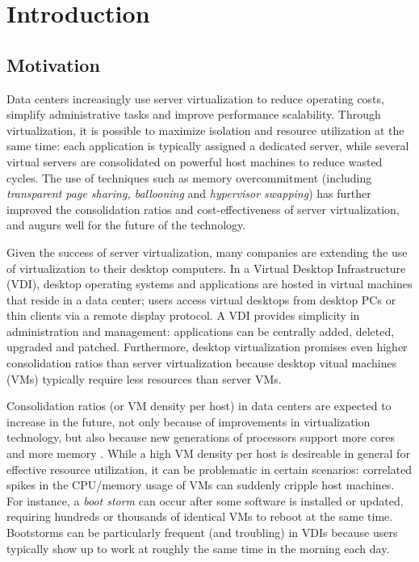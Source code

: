 \chapter{Introduction}
\section{Motivation}
Data centers increasingly use server virtualization to
reduce operating costs, simplify administrative tasks and improve 
performance scalability. Through virtualization, it is
possible to maximize isolation and resource utilization at the same time:
each application is typically assigned a dedicated server, 
while several virtual servers are consolidated on powerful host machines
to reduce wasted cycles. The use of techniques such as memory overcommitment (including 
\emph{transparent page sharing, ballooning} and \emph{hypervisor swapping}) \cite{waldspurger2002memory} 
has further improved the consolidation ratios and cost-effectiveness 
of server virtualization, and augurs well for the future of the technology.

Given the success of server virtualization, many companies are 
extending the use of virtualization to their desktop computers.
In a Virtual Desktop Infrastructure \cite{vmwarevdi} (VDI), 
desktop operating systems and applications are hosted in 
virtual machines that reside in a data center; 
users access virtual desktops from desktop PCs or thin clients
via a remote display protocol. A VDI provides simplicity 
in administration and management: applications
can be centrally added, deleted, upgraded and patched. 
Furthermore, desktop virtualization promises even
higher consolidation ratios than server virtualization
because desktop vitual machines (VMs) typically require
less resources than server VMs.

Consolidation ratios (or VM density per host) in data centers
are expected to increase in the future, not only because of
improvements in virtualization technology, but also because
new generations of processors support more cores and 
more memory \cite{hansen2010lithium}. 
While a high VM density per host is desireable in general for effective 
resource utilization, it can be problematic in certain scenarios:
correlated spikes in the CPU/memory usage of VMs can suddenly 
cripple host machines. For instance, a \emph{boot storm} \cite{hansen2010lithium, 
liao2011vmstore, meng2010tide, rajan2010vdc, vaghani2010virtual}
can occur after some software is installed or updated, requiring hundreds 
or thousands of identical VMs to reboot at the same time.
Bootstorms can be particularly frequent (and troubling) in VDIs because 
users typically show up to work at roughly the same time
in the morning each day.

